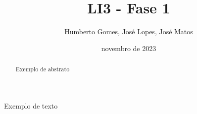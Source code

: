 \documentclass[12pt, a4paper]{article}
\title{\textbf{LI3 - Fase 1}}
\author{Humberto Gomes, José Lopes, José Matos}
\date{novembro de 2023}
\begin{document}
\maketitle
\onehalfspacing
\setlength{\parskip}{\baselineskip}
\setlength{\parindent}{0pt}

\begin{abstract}
	Exemplo de abstrato
\end{abstract}

Exemplo de texto
\end{document}
